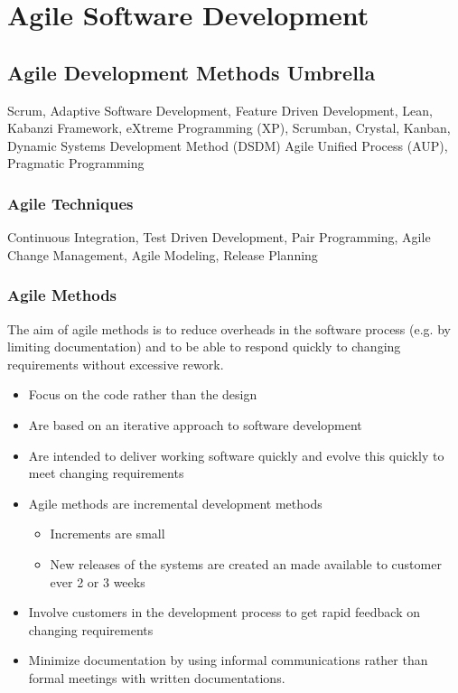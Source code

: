 \documentclass{report}
\begin{document}
\chapter{Agile Software Development} 
\section{Agile Development Methods Umbrella}
Scrum, Adaptive Software Development, Feature Driven Development, Lean, Kabanzi Framework, eXtreme Programming (XP), Scrumban, Crystal, Kanban, Dynamic Systems Development Method (DSDM) Agile Unified Process (AUP), Pragmatic Programming

\subsection{Agile Techniques}
Continuous Integration, Test Driven Development, Pair Programming, Agile Change Management, Agile Modeling, Release Planning

\subsection{Agile Methods}
The aim of agile methods is to reduce overheads in the software process (e.g. by limiting documentation) and to be able to respond quickly to changing requirements without excessive rework.
\begin{itemize}
  \item Focus on the code rather than the design
  \item Are based on an iterative approach to software development
  \item Are intended to deliver working software quickly and evolve this quickly to meet changing requirements
  \item Agile methods are incremental development methods
  \begin{itemize}
    \item Increments are small
    \item New releases of the systems are created an made available to customer ever 2 or 3 weeks
  \end{itemize}
  \item Involve customers in the development process to get rapid feedback on changing requirements
  \item Minimize documentation by using informal communications rather than formal meetings with written documentations.
\end{itemize}
\end{document}
